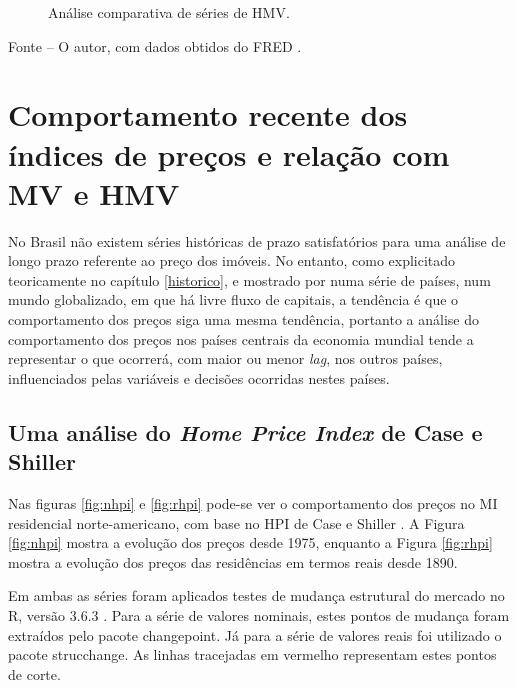 \documentclass[
	12pt,				%
	oneside,			%
	a4paper,			%
	chapter=TITLE,		%
	section=TITLE,		%
	english,			%
	brazil				%
	]{abntex2}
\newcommand{\pkg}[1]{{\normalfont\fontseries{b}\selectfont #1}}
\let\proglang=\textsf
\newcommand{\bcenter}{\begin{center}}
\newcommand{\ecenter}{\end{center}}
\begin{document}
\begin{refsection}
\begin{figure}[H]
{}

\caption{Análise comparativa de séries de \gls{HMV}.}\label{fig:twoseries}
\end{figure}
\bcenter

\small Fonte -- O autor, com dados obtidos do FRED \autocites{RSAHORUSQ156S}{CSUSHPINSA}.
\ecenter

\hypertarget{comportamento-recente-dos-uxedndices-de-preuxe7os-e-relauxe7uxe3o-com-e}{%
\section{\texorpdfstring{Comportamento recente dos índices de preços e relação com \gls{MV} e \gls{HMV}}{Comportamento recente dos índices de preços e relação com  e }}\label{comportamento-recente-dos-uxedndices-de-preuxe7os-e-relauxe7uxe3o-com-e}}

No Brasil não existem séries históricas de prazo satisfatórios para uma análise
de longo prazo referente ao preço dos imóveis. No entanto, como explicitado
teoricamente no capítulo \ref{historico}, e mostrado por \textcite{ADAMS2010} numa
série de países, num mundo globalizado, em que há livre fluxo de capitais, a
tendência é que o comportamento dos preços siga uma mesma tendência, portanto a
análise do comportamento dos preços nos países centrais da economia mundial
tende a representar o que ocorrerá, com maior ou menor \emph{lag}, nos outros países,
influenciados pelas variáveis e decisões ocorridas nestes países.

\hypertarget{uma-anuxe1lise-do-de-case-e-shiller}{%
\subsection{\texorpdfstring{Uma análise do \emph{Home Price Index} de Case e Shiller}{Uma análise do  de Case e Shiller}}\label{uma-anuxe1lise-do-de-case-e-shiller}}

Nas figuras \ref{fig:nhpi} e \ref{fig:rhpi} pode-se ver o comportamento dos
preços no \gls{MI} residencial norte-americano, com base no \gls{HPI} de Case e
Shiller \autocite{NBERw2506}. A Figura \ref{fig:nhpi} mostra a evolução dos preços
desde 1975, enquanto a Figura \ref{fig:rhpi} mostra a evolução dos preços
das residências em termos reais desde 1890.

Em ambas as séries foram aplicados testes de mudança estrutural do mercado no
\proglang{R}, versão 3.6.3 \autocite{R}.
Para a série de valores nominais, estes pontos de mudança foram extraídos pelo
pacote \pkg{changepoint}. Já para a série de valores reais foi utilizado o
pacote \pkg{strucchange}. As linhas tracejadas em vermelho representam estes
pontos de corte.
\begin{figure}[H]


\end{figure}
\end{refsection}
\end{document}
